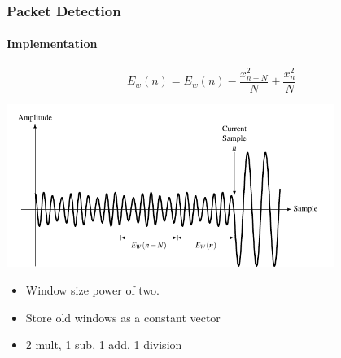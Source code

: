 \begin{frame} \frametitle{Packet Detection}
    \framesubtitle{Implementation}
    \begin{equation*}
        E_w(n) = E_w(n) - \frac{x_{n-N}^2}{N} + \frac{x_n^2}{N}
    \end{equation*}
    \begin{center}
        \includegraphics[width=0.8\textwidth]{img/dsw4}
    \end{center}
    \begin{itemize}
        \item Window size power of two.
        \item Store old windows as a constant vector
        \item 2 mult, 1 sub, 1 add, 1 division
    \end{itemize}
\end{frame}
